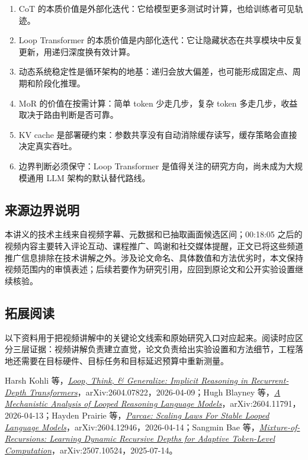 \begin{enumerate}
  \item CoT 的本质价值是外部化迭代：它给模型更多测试时计算，也给训练者可见轨迹。
  \item Loop Transformer 的本质价值是内部化迭代：它让隐藏状态在共享模块中反复更新，用递归深度换有效计算。
  \item 动态系统稳定性是循环架构的地基：递归会放大偏差，也可能形成固定点、周期和阶段化推理。
  \item MoR 的价值在按需计算：简单 token 少走几步，复杂 token 多走几步，收益取决于路由判断是否可靠。
  \item KV cache 是部署硬约束：参数共享没有自动消除缓存读写，缓存策略会直接决定真实吞吐。
  \item 边界判断必须保守：Loop Transformer 是值得关注的研究方向，尚未成为大规模通用 LLM 架构的默认替代路线。
\end{enumerate}

\subsection{来源边界说明}

本讲义的技术主线来自视频字幕、元数据和已抽取画面候选区间；00:18:05 之后的视频内容主要转入评论互动、课程推广、鸣谢和社交媒体提醒，正文已将这些频道推广信息排除在技术讲解之外。涉及论文命名、具体数值和方法优劣时，本文保持视频范围内的审慎表述；后续若要作为研究引用，应回到原论文和公开实验设置继续核验。

\subsection{拓展阅读}

以下资料用于把视频讲解中的关键论文线索和原始研究入口对应起来。阅读时应区分三层证据：视频讲解负责建立直觉，论文负责给出实验设置和方法细节，工程落地还需要在目标硬件、目标任务和目标延迟预算中重新测量。

\begingroup
\small
Harsh Kohli 等，\href{https://arxiv.org/abs/2604.07822}{\emph{Loop, Think, \& Generalize: Implicit Reasoning in Recurrent-Depth Transformers}}，arXiv:2604.07822，2026-04-09；Hugh Blayney 等，\href{https://arxiv.org/abs/2604.11791}{\emph{A Mechanistic Analysis of Looped Reasoning Language Models}}，arXiv:2604.11791，2026-04-13；Hayden Prairie 等，\href{https://arxiv.org/abs/2604.12946}{\emph{Parcae: Scaling Laws For Stable Looped Language Models}}，arXiv:2604.12946，2026-04-14；Sangmin Bae 等，\href{https://arxiv.org/abs/2507.10524}{\emph{Mixture-of-Recursions: Learning Dynamic Recursive Depths for Adaptive Token-Level Computation}}，arXiv:2507.10524，2025-07-14。
\par
\endgroup

